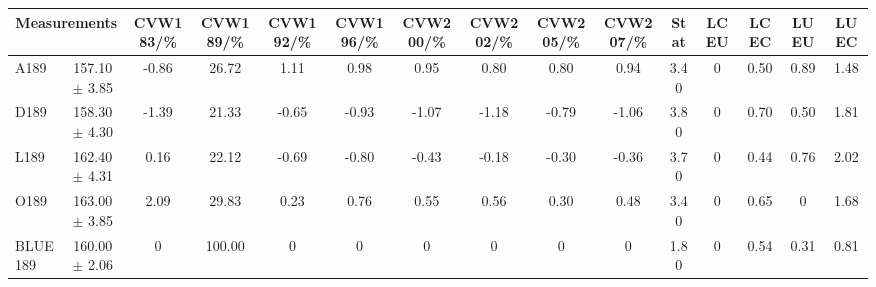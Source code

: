 \begin{table}[H]
\scriptsize
\begin{center}
\renewcommand{\arraystretch}{1.1}
\begin{tabular}{|lc|c|c|c|c|c|c|c|c|ccccc|}
\hline
\multicolumn{2}{|c|}{Measurements} & CVW{\tiny 183}/\%  & CVW{\tiny 189}/\%  & CVW{\tiny 192}/\%  & CVW{\tiny 196}/\%  & CVW{\tiny 200}/\%  & CVW{\tiny 202}/\%  & CVW{\tiny 205}/\%  & CVW{\tiny 207}/\%  & {\tiny Stat} & {\tiny LCEU} & {\tiny LCEC} & {\tiny LUEU} & {\tiny LUEC}\\
\hline
A189 &     157.10 $\pm$       3.85 &      -0.86 &      26.72 &       1.11 &       0.98 &       0.95 &       0.80 &       0.80 &       0.94 &       3.40 &  0 &       0.50 &       0.89 &       1.48\\
D189 &     158.30 $\pm$       4.30 &      -1.39 &      21.33 &      -0.65 &      -0.93 &      -1.07 &      -1.18 &      -0.79 &      -1.06 &       3.80 &  0 &       0.70 &       0.50 &       1.81\\
L189 &     162.40 $\pm$       4.31 &       0.16 &      22.12 &      -0.69 &      -0.80 &      -0.43 &      -0.18 &      -0.30 &      -0.36 &       3.70 &  0 &       0.44 &       0.76 &       2.02\\
O189 &     163.00 $\pm$       3.85 &       2.09 &      29.83 &       0.23 &       0.76 &       0.55 &       0.56 &       0.30 &       0.48 &       3.40 &  0 &       0.65 &  0 &       1.68\\
\hline
BLUE {\tiny 189} &     160.00 $\pm$       2.06 &  0 &     100.00 &  0 &  0 &  0 &  0 &  0 &  0 &       1.80 &  0 &       0.54 &       0.31 &       0.81\\
\hline
\end{tabular}
\renewcommand{\arraystretch}{1}
\end{center}
\end{table}
\vspace*{-0.5cm}
